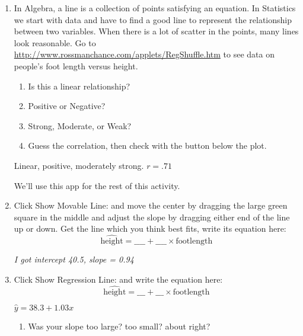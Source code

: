 \begin{enumerate}
\item  In Algebra, a line is a collection of points satisfying an
     equation. In Statistics we start with data and have to find a good
     line to represent the relationship between two variables.  When
     there is a lot of scatter in the points, many lines look
     reasonable.  Go to 
     \url{http://www.rossmanchance.com/applets/RegShuffle.htm}
     to see data on people's foot length versus height.
     \begin{enumerate}
     \item Is this a linear relationship? \\
     \item Positive or Negative? \\
     \item Strong, Moderate, or Weak? \\
     \item Guess the correlation, then check with the button below the
       plot.
     \end{enumerate}
\begin{key}
 Linear, positive, moderately strong.      $ r = .71$  
\end{key}

   We'll use this app for the rest of this activity.

\item Click {\sf Show Movable Line:} \fbox{$\surd$} and move the
  center by dragging the large green square in the middle and adjust
  the slope by dragging either end of the line up or down.  Get the
  line which you think best fits, write its equation here:
  $$ \widehat{\mbox{height}} = \_\_\_\_ + \_\_\_\_ \times \mbox{footlength}$$
\begin{students}
 \vspace{.2cm}      
\end{students}

\begin{key}
  {\it I got intercept 40.5, slope = 0.94}
\end{key}
\item Click {\sf Show Regression Line:} \fbox{$\surd$} and write the
  equation here:
  $$ \widehat{\mbox{height}} = \_\_\_ + \_\_\_ \times
  \mbox{footlength}$$
\begin{key}
  {\it $ \widehat{y} = 38.3 + 1.03 x$}
\end{key}
\begin{enumerate}
  \item Was your slope too large? too small? about right? 


\end{enumerate}
\end{enumerate}
